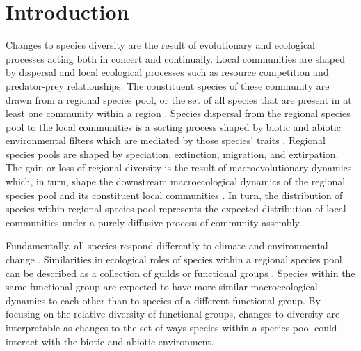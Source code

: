 \documentclass[12pt,letterpaper]{article}
\begin{document}
\section*{Introduction}
Changes to species diversity are the result of evolutionary and ecological processes acting both in concert and continually. Local communities are shaped by dispersal and local ecological processes such as resource competition and predator-prey relationships. The constituent species of these community are drawn from a regional species pool, or the set of all species that are present in at least one community within a region \citep{Mittelbach2015a,Urban2008,Harrison2008}. Species dispersal from the regional species pool to the local communities is a sorting process shaped by biotic and abiotic environmental filters which are mediated by those species' traits \citep{Shipley2006,Elith2009,Urban2008,Loeuille2008,Cottenie2005,Harrison2008}. Regional species pools are shaped by speciation, extinction, migration, and extirpation. The gain or loss of regional diversity is the result of macroevolutionary dynamics which, in turn, shape the downstream macroecological dynamics of the regional species pool and its constituent local communities \citep{Urban2008,Mittelbach2015a,Harrison2008}. In turn, the distribution of species within regional species pool represents the expected distribution of local communities under a purely diffusive process of community assembly.

Fundamentally, all species respond differently to climate and environmental change \citep{Blois2009}. Similarities in ecological roles of species within a regional species pool can be described as a collection of guilds or functional groups \citep{Valentine1969,Bambach1977,Brown1989,Simberloff1991a,Wilson1999}. Species within the same functional group are expected to have more similar macroecological dynamics to each other than to species of a different functional group. By focusing on the relative diversity of functional groups, changes to diversity are interpretable as changes to the set of ways species within a species pool could interact with the biotic and abiotic environment. 
\end{document}
